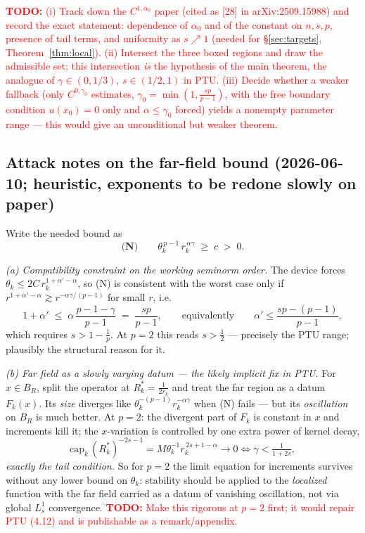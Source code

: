 \documentclass[11pt]{amsart}
\theoremstyle{plain}
\theoremstyle{definition}
\theoremstyle{remark}
\newcommand{\al}{\alpha}
\newcommand{\TODO}[1]{\textcolor{red}{\textbf{TODO:} #1}}
\begin{document}
\TODO{(i) Track down the $C^{1,\al_0}$ paper (cited as [28] in
arXiv:2509.15988) and record the exact statement: dependence of $\al_0$
and of the constant on $n,s,p$, presence of tail terms, and uniformity as
$s\nearrow1$ (needed for \S\ref{sec:targets}, Theorem~\ref{thm:local}).
(ii) Intersect the three boxed regions and draw the admissible set; this
intersection \emph{is} the hypothesis of the main theorem, the analogue of
$\gamma\in(0,1/3)$, $s\in(1/2,1)$ in PTU.
(iii) Decide whether a weaker fallback (only $C^{0,\gamma_0}$ estimates,
$\gamma_0=\min(1,\frac{sp}{p-1})$, with the free boundary condition
$u(x_0)=0$ only and $\al\le\gamma_0$ forced) yields a nonempty parameter
range --- this would give an unconditional but weaker theorem.}
\subsection*{Attack notes on the far-field bound (2026-06-10; heuristic,
exponents to be redone slowly on paper)}
Write the needed bound as
\[
  \textbf{(N)}\qquad \theta_k^{\,p-1}\, r_k^{\,\al\gamma}\;\ge\; c\;>\;0 .
\]

\emph{(a) Compatibility constraint on the working seminorm order.}
The device forces $\theta_k\le 2C\,r_k^{1+\al'-\al}$, so (N) is
consistent with the worst case only if
$r^{1+\al'-\al}\gtrsim r^{-\al\gamma/(p-1)}$ for small $r$, i.e.
\[
  1+\al' \;\le\; \al\,\frac{p-1-\gamma}{p-1} \;=\; \frac{sp}{p-1},
  \qquad\text{equivalently}\qquad
  \al' \le \frac{sp-(p-1)}{p-1},
\]
which requires $s>1-\frac1p$. At $p=2$ this reads $s>\frac12$ ---
precisely the PTU range; plausibly the structural reason for it.

\emph{(b) Far field as a slowly varying datum --- the likely implicit
fix in PTU.} For $x\in B_R$, split the operator at $R^*_k=\frac{1}{2r_k}$
and treat the far region as a datum $F_k(x)$. Its \emph{size} diverges
like $\theta_k^{-(p-1)}r_k^{-\al\gamma}$ when (N) fails --- but its
\emph{oscillation} on $B_R$ is much better. At $p=2$: the divergent part
of $F_k$ is constant in $x$ and increments kill it; the $x$-variation is
controlled by one extra power of kernel decay,
\[
  \mathrm{cap}_k\,(R^*_k)^{-2s-1}
  = M\theta_k^{-1}r_k^{\,2s+1-\al}\longrightarrow 0
  \iff \gamma<\tfrac{1}{1+2s},
\]
\emph{exactly the tail condition.} So for $p=2$ the limit equation for
increments survives without any lower bound on $\theta_k$: stability
should be applied to the \emph{localized} function with the far field
carried as a datum of vanishing oscillation, not via global $L^1_s$
convergence. \TODO{Make this rigorous at $p=2$ first; it would repair
PTU (4.12) and is publishable as a remark/appendix.}
\end{document}
